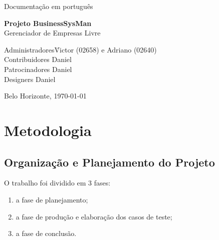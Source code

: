 \documentclass[a4paper,12pt]{article}
\newcommand{\thecompany}{\huge Documentação em português}
\newcommand{\thelogo}{\begin{figure}[H] \centering \texttt{[image: BRASAOUFV.jpg]} \end{figure}}
\newcommand{\thedate}{\today}
\newcommand{\thetitle}{\textbf{\LARGE  Projeto BusinessSysMan} \\ \large{Gerenciador de Empresas Livre}}
\newcommand{\theauthor}{Victor (02658) e Adriano (02640)}
\begin{document}
	
	\begin{titlepage}
		\begin{center}
			\thecompany
			
			
			\vspace{10pt}
			
			
			\vspace{60pt}
			
			\thetitle
			
			\vspace{160pt}
			
		\end{center}
		
		\begin{flushleft}
			\begin{tabbing}
				Administradores\qquad\qquad\= \theauthor \\
				Contribuidores\> Daniel\\
				Patrocinadores\> Daniel\\
				Designers\> Daniel\\
				
			\end{tabbing}
			
		\end{flushleft}
		
		\begin{center}
			\vspace{\fill}
			Belo Horizonte, \thedate
		\end{center}
	\end{titlepage}
	\tableofcontents
	\thispagestyle{empty}
	\clearpage
	\setcounter{page}{1}
	\begin{abstract}
	Este projeto tem o intuito de facilitar a administração financeira e de funcionários de pequenas, médias e grande Empresas sem nenhum custo e com total liberdade de alteração e distribuição. Inicialmente baseada na framework de interface gráfica nativa do linux GTK, buscamos o máximo de performance e compatibilidade com o mínimo de dependências para que a consulta aos dados seja rápida e acessível a todos. Todos arquivos estão disponibilizados em um \href{https://github.com/primary157/TP1AEDS1.git}{repositório do GitHub} com cada etapa do processo de criação. 
	\end{abstract}
	\section{Metodologia}
	
		\subsection{Organização e Planejamento do Projeto}
			O trabalho foi dividido em 3 fases: 
			\begin{enumerate}
				\item a fase de planejamento;
				\item a fase de produção e elaboração dos casos de teste;
				\item a fase de conclusão.
			\end{enumerate}
\end{document}
